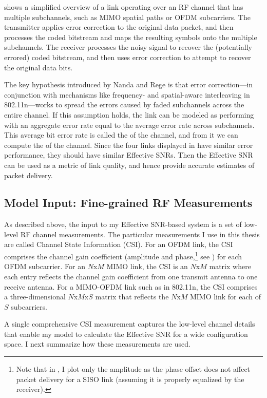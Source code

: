  shows a simplified overview of a link operating over an RF channel that has multiple subchannels, such as MIMO spatial paths or OFDM subcarriers. The transmitter applies error correction to the original data packet, and then processes the coded bitstream and maps the resulting symbols onto the multiple subchannels. The receiver processes the noisy signal to recover the (potentially errored) coded bitstream, and then uses error correction to attempt to recover the original data bits.

The key hypothesis introduced by Nanda and Rege is that error correction---in conjunction with mechanisms like frequency- and spatial-aware interleaving in 802.11n---works to spread the errors caused by faded subchannels across the entire channel. If this assumption holds, the link can be modeled as performing with an aggregate error rate equal to the average error rate across subchannels. This average bit error rate is called the  of the channel, and from it we can compute the  of the channel. Since the four links displayed in  have similar error performance, they should have similar Effective SNRs. Then the Effective SNR can be used as a metric of link quality, and hence provide accurate estimates of packet delivery.

\subsection{Model Input: Fine-grained RF Measurements}
\label{sec:csi}
As described above, the input to my Effective SNR-based system is a set of low-level RF channel measurements. The particular measurements I use in this thesis are called Channel State Information (CSI). For an OFDM link, the CSI comprises the channel gain coefficient (amplitude and phase,\footnote{Note that in , I plot only the amplitude as the phase offset does not affect packet delivery for a SISO link (assuming it is properly equalized by the receiver).} see ) for each OFDM subcarrier. For an $N$x$M$ MIMO link, the CSI is an $N$x$M$ matrix where each entry reflects the channel gain coefficient from one transmit antenna to one receive antenna. For a MIMO-OFDM link such as in 802.11n, the CSI comprises a three-dimensional $N$x$M$x$S$ matrix that reflects the $N$x$M$ MIMO link for each of $S$ subcarriers.

A single comprehensive CSI measurement captures the low-level channel details that enable my model to calculate the Effective SNR for a wide configuration space. I next summarize how these measurements are used.

